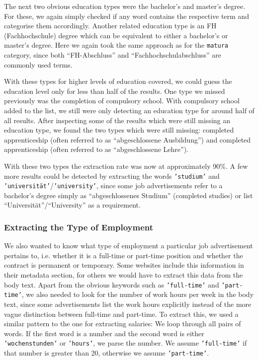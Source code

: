 \documentclass[runningheads]{llncs}
\newcommand{\german}[1]{{#1}}
\begin{document}
The next two obvious education types were the bachelor's and master's degree. For these, we again simply checked if any word contains the respective term and categorise them accordingly. Another related education type is an \german{FH} (\german{Fachhochschule}) degree which can be equivalent to either a bachelor's or master's degree. Here we again took the same approach as for the \texttt{matura} category, since both “\german{FH-Abschluss}” and “\german{Fachhochschulabschluss}” are commonly used terms.

With these types for higher levels of education covered, we could guess the education level only for less than half of the results. One type we missed previously was the completion of compulsory school. With compulsory school added to the list, we still were only detecting an education type for around half of all results. After inspecting some of the results which were still missing an education type, we found the two types which were still missing: completed apprenticeship (often referred to as “\german{abgeschlossene Ausbildung}”) and completed apprenticeship (often referred to as “\german{abgeschlossene Lehre}”).

With these two types the extraction rate was now at approximately 90\%. A few more results could be detected by extracting the words \texttt{'studium'} and \texttt{'universität'}/\texttt{'university'}, since some job advertisements refer to a bachelor's degree simply as “\german{abgeschlossenes Studium}” (completed studies) or list “\german{Universität}”/“University” as a requirement.


\subsubsection{Extracting the Type of Employment}
\label{subsub:extracting_the_type_of_employment}

We also wanted to know what type of employment a particular job advertisement pertains to, i.e. whether it is a full-time or part-time position and whether the contract is permanent or temporary. Some websites include this information in their metadata section, for others we would have to extract this data from the body text. Apart from the obvious keywords such as \texttt{'full-time'} and \texttt{'part-time'}, we also needed to look for the number of work hours per week in the body text, since some advertisements list the work hours explicitly instead of the more vague distinction between full-time and part-time. To extract this, we used a similar pattern to the one for extracting salaries: We loop through all pairs of words. If the first word is a number and the second word is either \texttt{'wochenstunden'} or \texttt{'hours'}, we parse the number. We assume \texttt{'full-time'} if that number is greater than 20, otherwise we assume \texttt{'part-time'}.
\end{document}
